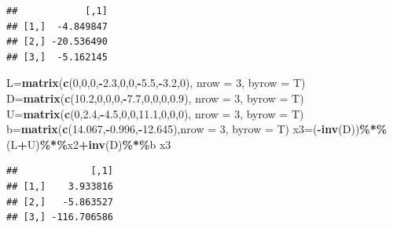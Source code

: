 \documentclass[
]{article}
\newenvironment{Shaded}{\begin{snugshade}}{\end{snugshade}}
\newcommand{\AttributeTok}[1]{\textcolor[rgb]{0.13,0.29,0.53}{#1}}
\newcommand{\DecValTok}[1]{\textcolor[rgb]{0.00,0.00,0.81}{#1}}
\newcommand{\FloatTok}[1]{\textcolor[rgb]{0.00,0.00,0.81}{#1}}
\newcommand{\FunctionTok}[1]{\textcolor[rgb]{0.13,0.29,0.53}{\textbf{#1}}}
\newcommand{\NormalTok}[1]{#1}
\newcommand{\OtherTok}[1]{\textcolor[rgb]{0.56,0.35,0.01}{#1}}
\newcommand{\SpecialCharTok}[1]{\textcolor[rgb]{0.81,0.36,0.00}{\textbf{#1}}}
\begin{document}
\begin{verbatim}
##            [,1]
## [1,]  -4.849847
## [2,] -20.536490
## [3,]  -5.162145
\end{verbatim}

\begin{Shaded}
\begin{Highlighting}[]
\NormalTok{  L}\OtherTok{=}\FunctionTok{matrix}\NormalTok{(}\FunctionTok{c}\NormalTok{(}\DecValTok{0}\NormalTok{,}\DecValTok{0}\NormalTok{,}\DecValTok{0}\NormalTok{,}\SpecialCharTok{{-}}\FloatTok{2.3}\NormalTok{,}\DecValTok{0}\NormalTok{,}\DecValTok{0}\NormalTok{,}\SpecialCharTok{{-}}\FloatTok{5.5}\NormalTok{,}\SpecialCharTok{{-}}\FloatTok{3.2}\NormalTok{,}\DecValTok{0}\NormalTok{), }\AttributeTok{nrow =} \DecValTok{3}\NormalTok{, }\AttributeTok{byrow =}\NormalTok{ T)}
\NormalTok{  D}\OtherTok{=}\FunctionTok{matrix}\NormalTok{(}\FunctionTok{c}\NormalTok{(}\FloatTok{10.2}\NormalTok{,}\DecValTok{0}\NormalTok{,}\DecValTok{0}\NormalTok{,}\DecValTok{0}\NormalTok{,}\SpecialCharTok{{-}}\FloatTok{7.7}\NormalTok{,}\DecValTok{0}\NormalTok{,}\DecValTok{0}\NormalTok{,}\DecValTok{0}\NormalTok{,}\FloatTok{0.9}\NormalTok{), }\AttributeTok{nrow =} \DecValTok{3}\NormalTok{, }\AttributeTok{byrow =}\NormalTok{ T)}
\NormalTok{  U}\OtherTok{=}\FunctionTok{matrix}\NormalTok{(}\FunctionTok{c}\NormalTok{(}\DecValTok{0}\NormalTok{,}\FloatTok{2.4}\NormalTok{,}\SpecialCharTok{{-}}\FloatTok{4.5}\NormalTok{,}\DecValTok{0}\NormalTok{,}\DecValTok{0}\NormalTok{,}\FloatTok{11.1}\NormalTok{,}\DecValTok{0}\NormalTok{,}\DecValTok{0}\NormalTok{,}\DecValTok{0}\NormalTok{), }\AttributeTok{nrow =} \DecValTok{3}\NormalTok{, }\AttributeTok{byrow =}\NormalTok{ T)}
\NormalTok{  b}\OtherTok{=}\FunctionTok{matrix}\NormalTok{(}\FunctionTok{c}\NormalTok{(}\FloatTok{14.067}\NormalTok{,}\SpecialCharTok{{-}}\FloatTok{0.996}\NormalTok{,}\SpecialCharTok{{-}}\FloatTok{12.645}\NormalTok{),}\AttributeTok{nrow =} \DecValTok{3}\NormalTok{, }\AttributeTok{byrow =}\NormalTok{ T)}
\NormalTok{  x3}\OtherTok{=}\NormalTok{(}\SpecialCharTok{{-}}\FunctionTok{inv}\NormalTok{(D))}\SpecialCharTok{\%*\%}\NormalTok{(L}\SpecialCharTok{+}\NormalTok{U)}\SpecialCharTok{\%*\%}\NormalTok{x2}\SpecialCharTok{+}\FunctionTok{inv}\NormalTok{(D)}\SpecialCharTok{\%*\%}\NormalTok{b}
\NormalTok{  x3}
\end{Highlighting}
\end{Shaded}

\begin{verbatim}
##             [,1]
## [1,]    3.933816
## [2,]   -5.863527
## [3,] -116.706586
\end{verbatim}
\end{document}
